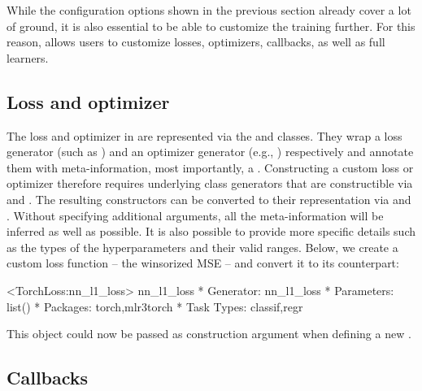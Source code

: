 \documentclass[article]{jss}
\theoremstyle{definition}
\begin{document}
While the configuration options shown in the previous section already cover a lot of ground, it is also essential to be able to customize the training further.
For this reason,  allows users to customize losses, optimizers, callbacks, as well as full learners.

\subsection{Loss and optimizer}\label{sec:extending-loss-opt}

The loss and optimizer in \mlrttorch{} are represented via the  and  classes.
They wrap a loss generator (such as ) and an optimizer generator (e.g., ) respectively and annotate them with meta-information, most importantly, a .
Constructing a custom loss or optimizer therefore requires underlying class generators that are constructible via  and .
The resulting constructors can be converted to their \mlrttorch{} representation via  and .
Without specifying additional arguments, all the meta-information will be inferred as well as possible.
It is also possible to provide more specific details such as the types of the hyperparameters and their valid ranges.
Below, we create a custom  loss function -- the winsorized MSE -- and convert it to its \mlrttorch{} counterpart:

\begin{CodeOutput}
<TorchLoss:nn_l1_loss> nn_l1_loss
* Generator: nn_l1_loss
* Parameters: list()
* Packages: torch,mlr3torch
* Task Types: classif,regr
\end{CodeOutput}

This object could now be passed as construction argument  when defining a new .

\subsection{Callbacks}\label{sec:extending-callbacks}
\end{document}
